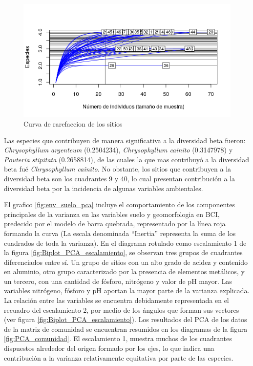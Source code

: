 \documentclass[11pt,]{article}
\begin{document}
\begin{figure}
\centering
\includegraphics{Curva_rarefaccion.png}
\caption{Curva de rarefaccion de los sitios
\label{fig:Curva_rarefaccion}}
\end{figure}

Las especies que contribuyen de manera significativa a la diversidad
beta fueron: \emph{Chrysophyllum argenteum} (0.2504234),
\emph{Chrysophyllum cainito} (0.3147978) y \emph{Pouteria stipitata}
(0.2658814), de las cuales la que mas contribuyó a la diversidad beta
fué \emph{Chrysophyllum cainito}. No obstante, los sitios que
contribuyen a la diversidad beta son los cuadrantes 9 y 40, lo cual
presentan contribución a la diversidad beta por la incidencia de algunas
variables ambientales.

El grafico \ref{fig:env_suelo_pca} incluye el comportamiento de los
componentes principales de la varianza en las variables suelo y
geomorfologia en BCI, predecido por el modelo de barra quebrada,
representado por la línea roja formando la curva (La escala denominada
``Inertia'' representa la suma de los cuadrados de toda la varianza). En
el diagrama rotulado como escalamiento 1 de la figura
\ref{fig:Biplot_PCA_escalamiento}, se observan tres grupos de cuadrantes
diferenciados entre sí. Un grupo de sitios con un alto grado de acidez y
contenido en aluminio, otro grupo caracterizado por la presencia de
elementos metálicos, y un tercero, con una cantidad de fósforo,
nitrógeno y valor de pH mayor. Las variables nitrógeno, fósforo y pH
aportan la mayor parte de la varianza explicada. La relación entre las
variables se encuentra debidamente representada en el recuadro del
escalamiento 2, por medio de los ángulos que forman sus vectores (ver
figura \ref{fig:Biplot_PCA_escalamiento}). Los resultados del PCA de los
datos de la matriz de comunidad se encuentran resumidos en los diagramas
de la figura \ref{fig:PCA_comunidad}. El escalamiento 1, muestra muchos
de los cuadrantes dispuestos alrededor del origen formado por los ejes,
lo que indica una contribución a la varianza relativamente equitativa
por parte de las especies.
\end{document}
